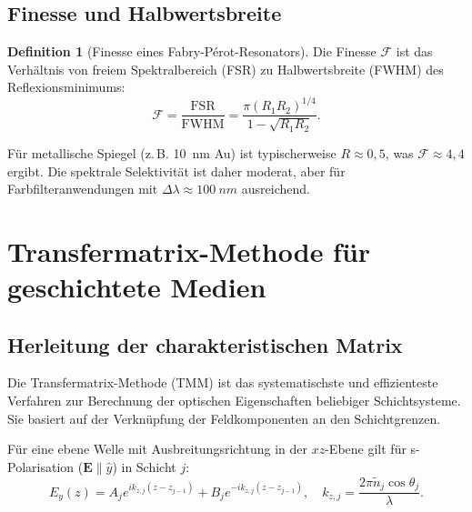 ﻿\documentclass[a4paper,12pt]{article}
\theoremstyle{definition}
\newtheorem{definition}{Definition}[section]
\newcommand{\vect}[1]{\bm{#1}}
\begin{document}
	\subsection{Finesse und Halbwertsbreite}
	
	\begin{definition}[Finesse eines Fabry-Pérot-Resonators]
		\label{def:finesse}
		Die Finesse $\mathcal{F}$ ist das Verhältnis von freiem Spektralbereich (FSR)
		zu Halbwertsbreite (FWHM) des Reflexionsminimums:
		\begin{equation}
			\mathcal{F} = \frac{\mathrm{FSR}}{\mathrm{FWHM}} = \frac{\pi (R_1 R_2)^{1/4}}{1 - \sqrt{R_1 R_2}}.
			\label{eq:finesse}
		\end{equation}
	\end{definition}
	
	Für metallische Spiegel (z.\,B. \SI{10}{nm} Au) ist typischerweise
	$R \approx 0{,}5$, was $\mathcal{F} \approx 4{,}4$ ergibt.
	Die spektrale Selektivität ist daher moderat, aber für Farbfilteranwendungen
	mit $\Delta\lambda \approx \SI{100}{nm}$ ausreichend.
	
	\section{Transfermatrix-Methode für geschichtete Medien}
	\label{sec:tmm}
	
	\subsection{Herleitung der charakteristischen Matrix}
	
	Die Transfermatrix-Methode (TMM) ist das systematischste und effizienteste
	Verfahren zur Berechnung der optischen Eigenschaften beliebiger Schichtsysteme.
	Sie basiert auf der Verknüpfung der Feldkomponenten an den Schichtgrenzen.
	
	Für eine ebene Welle mit Ausbreitungsrichtung in der $xz$-Ebene gilt
	für s-Polarisation ($\vect{E} \parallel \hat{y}$) in Schicht $j$:
	\begin{equation}
		E_y(z) = A_j e^{ik_{z,j}(z-z_{j-1})} + B_j e^{-ik_{z,j}(z-z_{j-1})},
		\quad k_{z,j} = \frac{2\pi \tilde{n}_j \cos\theta_j}{\lambda}.
		\label{eq:feldansatz}
	\end{equation}
	
\end{document}
